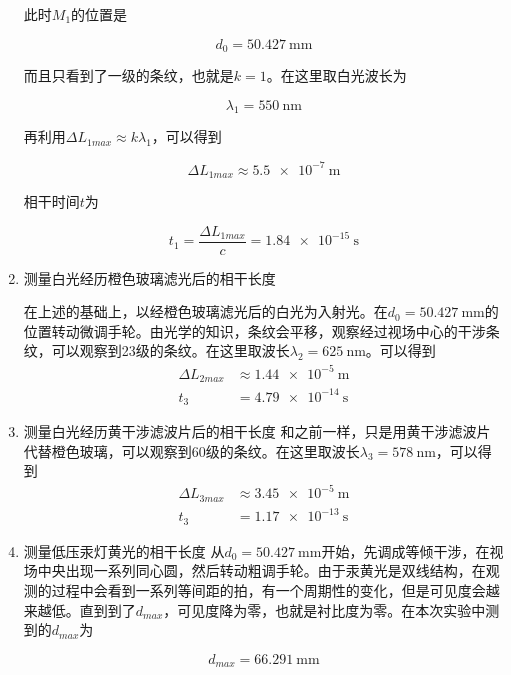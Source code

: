 \documentclass[a4paper]{article}
\begin{document}
\begin{changemargin}{1cm}{1cm}
\begin{spacing}{1.6}
\begin{enumerate}
                  此时$M_1$的位置是

                  $$d_0=\SI{50.427}{\mm}$$

                  而且只看到了一级的条纹，也就是$k=1$。在这里取白光波长为

                  $$\lambda_1=\SI{550}{\nm}$$

                  再利用$\Delta L_{1max}\approx k \lambda_1$，可以得到

                  $$\Delta L_{1max} \approx \SI{5.5e-7}{\m}$$

                  相干时间$t$为

                  $$t_1=\frac{\Delta L_{1max}}{c}=\SI{1.84e-15}{\s}$$

            \item 测量白光经历橙色玻璃滤光后的相干长度

                  在上述的基础上，以经橙色玻璃滤光后的白光为入射光。在$d_0=\SI{50.427}{\mm}$的位置转动微调手轮。由光学的知识，条纹会平移，观察经过视场中心的干涉条纹，可以观察到23级的条纹。在这里取波长$\lambda_2=\SI{625}{\nm}$。可以得到
                  $$\begin{aligned}
                          \Delta L_{2max} & \approx \SI{1.44e-5}{\m} \\
                          t_3             & =\SI{4.79e-14}{\s}
                      \end{aligned}$$

            \item 测量白光经历黄干涉滤波片后的相干长度
                  和之前一样，只是用黄干涉滤波片代替橙色玻璃，可以观察到60级的条纹。在这里取波长$\lambda_3=\SI{578}{\nm}$，可以得到
                  $$\begin{aligned}
                          \Delta L_{3max} & \approx \SI{3.45e-5}{\m} \\
                          t_3             & =\SI{1.17e-13}{\s}
                      \end{aligned}$$

            \item 测量低压汞灯黄光的相干长度
                  从$d_0=\SI{50.427}{\mm}$开始，先调成等倾干涉，在视场中央出现一系列同心圆，然后转动粗调手轮。由于汞黄光是双线结构，在观测的过程中会看到一系列等间距的拍，有一个周期性的变化，但是可见度会越来越低。直到到了$d_{max}$，可见度降为零，也就是衬比度为零。在本次实验中测到的$d_{max}$为

                  $$ d_{max}=\SI{66.291}{\mm}$$


\end{enumerate}
\end{spacing}
\end{changemargin}
\end{document}
